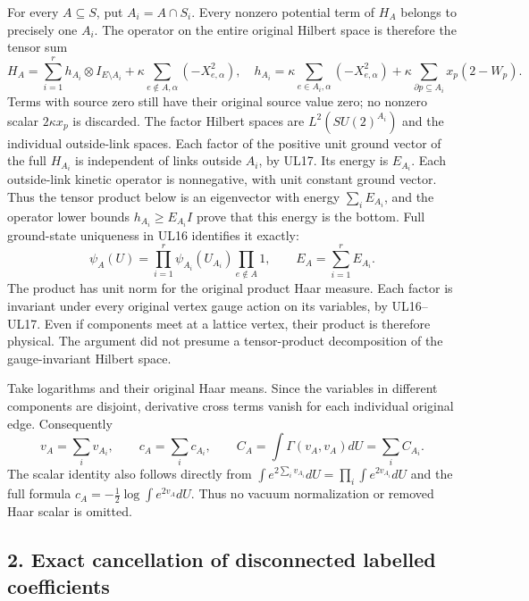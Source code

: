 \documentclass[11pt]{article}
\begin{document}
For every \(A\subseteq S\), put \(A_i=A\cap S_i\). Every nonzero potential term of \(H_A\) belongs to precisely one \(A_i\). The operator on the entire original Hilbert space is therefore the tensor sum
\[
H_A=\sum_{i=1}^r h_{A_i}\otimes I_{E\setminus A_i}
 +\kappa\sum_{e\notin A,\alpha}(-X_{e,\alpha}^2),
\quad
h_{A_i}=\kappa\sum_{e\in A_i,\alpha}(-X_{e,\alpha}^2)
 +\kappa\sum_{\partial p\subseteq A_i}x_p(2-W_p).
\tag{UF3}
\]
Terms with source zero still have their original source value zero; no nonzero scalar \(2\kappa x_p\) is discarded. The factor Hilbert spaces are \(L^2(SU(2)^{A_i})\) and the individual outside-link spaces. Each factor of the positive unit ground vector of the full \(H_{A_i}\) is independent of links outside \(A_i\), by UL17. Its energy is \(E_{A_i}\). Each outside-link kinetic operator is nonnegative, with unit constant ground vector. Thus the tensor product below is an eigenvector with energy \(\sum_iE_{A_i}\), and the operator lower bounds \(h_{A_i}\ge E_{A_i}I\) prove that this energy is the bottom. Full ground-state uniqueness in UL16 identifies it exactly:
\[
\boxed{\psi_A(U)=\prod_{i=1}^r\psi_{A_i}(U_{A_i})
                   \prod_{e\notin A}1,
\qquad E_A=\sum_{i=1}^rE_{A_i}.}
\tag{UF4}
\]
The product has unit norm for the original product Haar measure. Each factor is invariant under every original vertex gauge action on its variables, by UL16–UL17. Even if components meet at a lattice vertex, their product is therefore physical. The argument did not presume a tensor-product decomposition of the gauge-invariant Hilbert space.

Take logarithms and their original Haar means. Since the variables in different components are disjoint, derivative cross terms vanish for each individual original edge. Consequently
\[
\boxed{v_A=\sum_i v_{A_i},\qquad c_A=\sum_i c_{A_i},\qquad
C_A=\int\Gamma(v_A,v_A)dU=\sum_i C_{A_i}.}
\tag{UF5}
\]
The scalar identity also follows directly from
\(\int e^{2\sum_i v_{A_i}}dU=\prod_i\int e^{2v_{A_i}}dU\) and the full formula \(c_A=-\tfrac12\log\int e^{2v_A}dU\). Thus no vacuum normalization or removed Haar scalar is omitted.

\subsection*{2. Exact cancellation of disconnected labelled coefficients}
\end{document}
